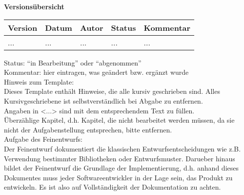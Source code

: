 
{\textbf{Versionsübersicht}}\\[2ex]

\begin{longtable}{|m{1.78cm}|m{1.59cm}|m{2.86cm}|m{1.9cm}|m{5.25cm}|}

  \hline                                              %

  \textbf{Version}  &    \textbf{Datum}  &    \textbf{Autor}  &
  \textbf{Status}   &    \textbf{Kommentar}       \\  %
  \hline                                              %


  ...    &    ...    &    ...    &    ...    &    ...\\      %
  \hline                                                     %

\end{longtable}
Status: "`in Bearbeitung"' oder "`abgenommen"'\\
Kommentar: hier eintragen, was ge\"andert bzw. erg\"anzt wurde\\

Hinweis zum Template:\\
Dieses Template enth\"alt Hinweise, die alle kursiv geschrieben sind. Alles
Kursivgeschriebene ist selbstverst\"andlich bei Abgabe zu entfernen.\\
Angaben in <...> sind mit dem entsprechendem Text zu f\"ullen.\\
\"Uberz\"ahlige Kapitel, d.h. Kapitel, die nicht bearbeitet werden m\"ussen, da
sie nicht der Aufgabenstellung entsprechen, bitte entfernen.\\

Aufgabe des Feinentwurfs:\\
Der Feinentwurf dokumentiert die klassischen Entwurfsentscheidungen wie z.B.
Verwendung bestimmter Bibliotheken oder Entwurfsmuster. Darueber hinaus
bildet der Feinentwurf die Grundlage der Implementierung, d.h. anhand
dieses Dokumentes muss jeder Softwareentwickler in der Lage sein, das Produkt
zu entwickeln. Es ist also auf Vollst\"andigkeit der Dokumentation zu
achten.
